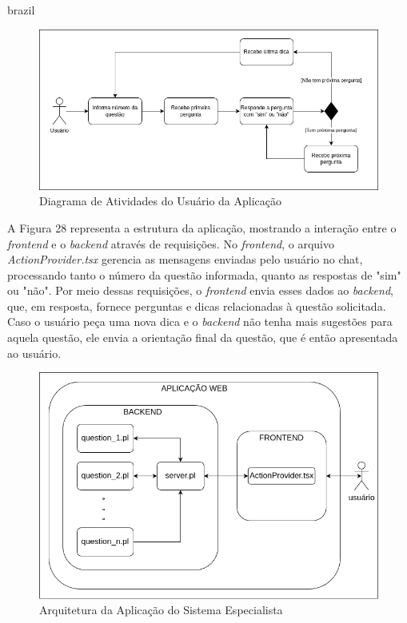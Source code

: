 \begin{otherlanguage*}{brazil}
\begin{figure}[h!]
    \centering
            \caption{Diagrama de Atividades do Usuário da Aplicação}
            \label{fig:ModeloConceitual}
        \includegraphics[scale=0.6]{pictures/atividade1.png}
\end{figure}

A Figura 28 representa a estrutura da aplicação, mostrando a interação entre o \textit{frontend} e o \textit{backend} através de requisições. No \textit{frontend}, o arquivo \textit{ActionProvider.tsx} gerencia as mensagens enviadas pelo usuário no chat, processando tanto o número da questão informada, quanto as respostas de "sim" ou "não". Por meio dessas requisições, o \textit{frontend} envia esses dados ao \textit{backend}, que, em resposta, fornece perguntas e dicas relacionadas à questão solicitada. Caso o usuário peça uma nova dica e o \textit{backend} não tenha mais sugestões para aquela questão, ele envia a orientação final da questão, que é então apresentada ao usuário.

\begin{figure}[h!]
    \centering
            \caption{Arquitetura da Aplicação do Sistema Especialista}
            \label{fig:ModeloConceitual}
        \includegraphics[scale=0.6]{pictures/arquitetura.png}
\end{figure}


\end{otherlanguage*}
